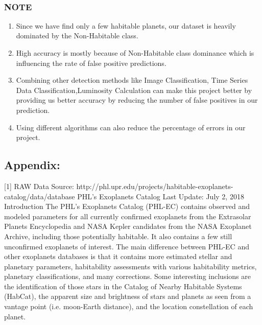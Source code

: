 \documentclass[11pt]{article}
\providecommand{\tightlist}{%
      \setlength{\itemsep}{0pt}\setlength{\parskip}{0pt}}
\begin{document}
    \begin{center}
    \end{center}
    { \hspace*{\fill} \\}
    
    \subsubsection{NOTE}\label{note}

    \begin{enumerate}
\def\labelenumi{\arabic{enumi}.}
\tightlist
\item
  Since we have find only a few habitable planets, our dataset is
  heavily dominated by the Non-Habitable class.
\item
  High accuracy is mostly because of Non-Habitable class dominance which
  is influencing the rate of false positive predictions.
\item
  Combining other detection methods like Image Classification, Time
  Series Data Classification,Luminosity Calculation can make this
  project better by providing us better accuracy by reducing the number
  of false positives in our prediction.
\item
  Using different algorithms can also reduce the percentage of errors in
  our project.
\end{enumerate}

    \subsection{Appendix:}\label{appendix}

{[}1{]} RAW Data Source:
http://phl.upr.edu/projects/habitable-exoplanets-catalog/data/database
PHL's Exoplanets Catalog Last Update: July 2, 2018 Introduction The
PHL's Exoplanets Catalog (PHL-EC) contains observed and modeled
parameters for all currently confirmed exoplanets from the Extrasolar
Planets Encyclopedia and NASA Kepler candidates from the NASA Exoplanet
Archive, including those potentially habitable. It also contains a few
still unconfirmed exoplanets of interest. The main difference between
PHL-EC and other exoplanets databases is that it contains more estimated
stellar and planetary parameters, habitability assessments with various
habitability metrics, planetary classifications, and many corrections.
Some interesting inclusions are the identification of those stars in the
Catalog of Nearby Habitable Systems (HabCat), the apparent size and
brightness of stars and planets as seen from a vantage point (i.e.
moon-Earth distance), and the location constellation of each planet.
\end{document}

